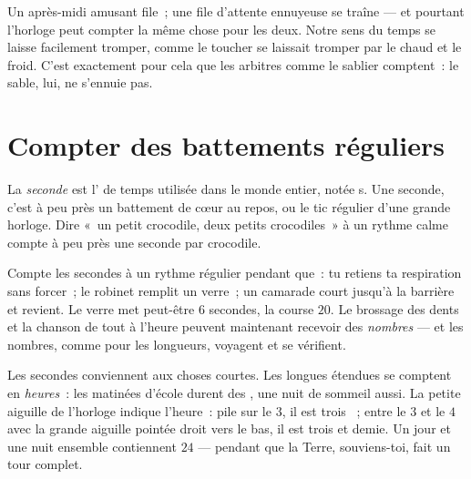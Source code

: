 \begin{remark}\label{rem:g2:measuring-time:feelings}
Un après-midi amusant file~; une file d'attente ennuyeuse se traîne
--- et pourtant l'horloge peut compter la même chose pour les deux.
Notre sens du temps se laisse facilement tromper, comme le toucher se
laissait tromper par le chaud et le froid. C'est exactement pour cela
que les arbitres comme le sablier comptent~: le sable, lui, ne
s'ennuie pas.
\end{remark}

\section{Compter des battements réguliers}

\begin{definition}[La seconde]\label{def:g2:measuring-time:second}
La \emph{seconde} est l' de temps utilisée dans
le monde entier, notée \unit{s}. Une seconde, c'est à peu près un
battement de cœur au repos, ou le tic régulier d'une grande horloge.
Dire «~un petit crocodile, deux petits crocodiles~» à un rythme calme
compte à peu près une seconde par crocodile.
\end{definition}

\begin{example}\label{ex:g2:measuring-time:count}
Compte les secondes à un rythme régulier pendant que~: tu retiens ta
respiration sans forcer~; le robinet remplit un verre~; un camarade
court jusqu'à la barrière et revient. Le verre met peut-être $6$
secondes, la course $20$. Le brossage des dents et la chanson de tout
à l'heure peuvent maintenant recevoir des \emph{nombres} --- et les
nombres, comme pour les longueurs, voyagent et se vérifient.
\end{example}

\begin{example}\label{ex:g2:measuring-time:clock}
Les secondes conviennent aux choses courtes. Les longues étendues se
comptent en \emph{heures}~: les matinées d'école durent
des , une nuit de sommeil aussi. La petite aiguille de
l'horloge indique l'heure~: pile sur le $3$, il est trois ~;
entre le $3$ et le $4$ avec la grande aiguille pointée droit vers le
bas, il est trois  et demie. Un jour et une nuit ensemble
contiennent $24$  --- pendant que la Terre, souviens-toi, fait
un tour complet.
\end{example}

